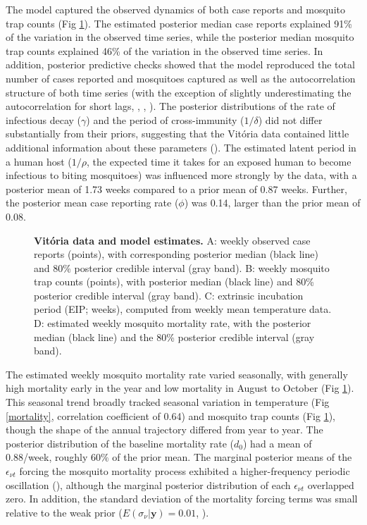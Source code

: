 \documentclass[10pt,letterpaper]{article}
\begin{document}
The model captured the observed dynamics of both case reports and mosquito trap counts (Fig \ref{timeseries}).
The estimated posterior median case reports explained 91\% of the variation in the observed time series, while the posterior median mosquito trap counts explained 46\% of the variation in the observed time series. 
In addition, posterior predictive checks showed that the model reproduced the total number of cases reported and mosquitoes captured as well as the autocorrelation structure of both time series (with the exception of slightly underestimating the autocorrelation for short lags, , , ).
The posterior distributions of the rate of infectious decay ($\gamma$) and the period of cross-immunity ($1/\delta$) did not differ substantially from their priors, suggesting that the Vit\'oria data contained little additional information about these parameters ().
The estimated latent period in a human host ($1/\rho$, the expected time it takes for an exposed human to become infectious to biting mosquitoes) was influenced more strongly by the data, with a posterior mean of 1.73 weeks compared to a prior mean of 0.87 weeks.
Further, the posterior mean case reporting rate ($\phi$) was 0.14, larger than the prior mean of 0.08.

\begin{figure}[!h]
\caption{{\bf Vit\'oria data and model estimates.}
A: weekly observed case reports (points), with corresponding posterior median (black line) and 80\% posterior credible interval (gray band). B: weekly mosquito trap counts (points), with posterior median (black line) and 80\% posterior credible interval (gray band). C: extrinsic incubation period (EIP; weeks), computed from weekly mean temperature data. D: estimated weekly mosquito mortality rate, with the posterior median (black line) and the 80\% posterior credible interval (gray band).
}
\label{timeseries}
\end{figure}

The estimated weekly mosquito mortality rate varied seasonally, with generally high mortality early in the year and low mortality in August to October (Fig \ref{timeseries}).
This seasonal trend broadly tracked seasonal variation in temperature (Fig \ref{mortality}, correlation coefficient of 0.64) and mosquito trap counts (Fig \ref{timeseries}), though the shape of the annual trajectory differed from year to year.
The posterior distribution of the baseline mortality rate ($d_0$) had a mean of 0.88/week, roughly $60\%$ of the prior mean.
The marginal posterior means of the $\epsilon_{\nu t}$ forcing the mosquito mortality process exhibited a higher-frequency periodic oscillation (), although the marginal posterior distribution of each $\epsilon_{\nu t}$ overlapped zero.
In addition, the standard deviation of the mortality forcing terms was small relative to the weak prior ($E(\sigma_{\nu}|\mathbf{y}) = 0.01$, ).
\end{document}
